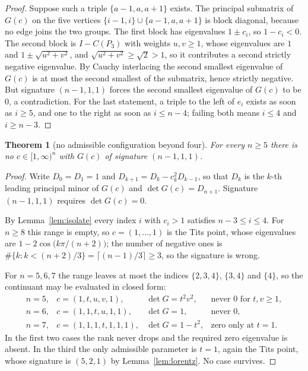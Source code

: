 \documentclass[11pt]{article}
\newtheorem{theorem}{Theorem}[section]
\theoremstyle{definition}
\theoremstyle{remark}
\theoremstyle{definition}
\begin{document}
\begin{proof}
Suppose such a triple $\{a-1,a,a+1\}$ exists. The principal submatrix of $G(c)$ on the five
vertices $\{i-1,i\}\cup\{a-1,a,a+1\}$ is block diagonal, because no edge joins the two groups. The
first block has eigenvalues $1\pm c_i$, so $1-c_i<0$. The second block is $I-C(P_3)$ with weights
$u,v\ge1$, whose eigenvalues are $1$ and $1\pm\sqrt{u^2+v^2}$, and $\sqrt{u^2+v^2}\ge\sqrt2>1$, so
it contributes a second strictly negative eigenvalue. By Cauchy interlacing the second smallest
eigenvalue of $G(c)$ is at most the second smallest of the submatrix, hence strictly negative. But
signature $(n-1,1,1)$ forces the second smallest eigenvalue of $G(c)$ to be $0$, a contradiction.
For the last statement, a triple to the left of $e_i$ exists as soon as $i\ge5$, and one to the
right as soon as $i\le n-4$; failing both means $i\le4$ and $i\ge n-3$.
\end{proof}

\begin{theorem}[no admissible configuration beyond four]\label{thm:nofive}
For every $n\ge5$ there is no $c\in[1,\infty)^n$ with $G(c)$ of signature $(n-1,1,1)$.
\end{theorem}

\begin{proof}
Write $D_0=D_1=1$ and $D_{k+1}=D_k-c_k^2D_{k-1}$, so that $D_k$ is the $k$-th leading principal
minor of $G(c)$ and $\det G(c)=D_{n+1}$. Signature $(n-1,1,1)$ requires $\det G(c)=0$.

By Lemma~\ref{lem:isolate} every index $i$ with $c_i>1$ satisfies $n-3\le i\le4$. For $n\ge8$ this
range is empty, so $c=(1,\dots,1)$ is the Tits point, whose eigenvalues are
$1-2\cos\bigl(k\pi/(n+2)\bigr)$; the number of negative ones is
$\#\{k:k<(n+2)/3\}=\lceil(n-1)/3\rceil\ge3$, so the signature is wrong.

For $n=5,6,7$ the range leaves at most the indices $\{2,3,4\}$, $\{3,4\}$ and $\{4\}$, so the
continuant may be evaluated in closed form:
\[
\begin{array}{llll}
  n=5, & c=(1,t,u,v,1), & \det G=t^2v^2, & \text{never }0\text{ for }t,v\ge1,\\[2pt]
  n=6, & c=(1,1,t,u,1,1), & \det G=1, & \text{never }0,\\[2pt]
  n=7, & c=(1,1,1,t,1,1,1), & \det G=1-t^2, & \text{zero only at }t=1 .
\end{array}
\]
In the first two cases the rank never drops and the required zero eigenvalue is absent. In the
third the only admissible parameter is $t=1$, again the Tits point, whose signature is $(5,2,1)$ by
Lemma~\ref{lem:lorentz}. No case survives.
\end{proof}
\end{document}
